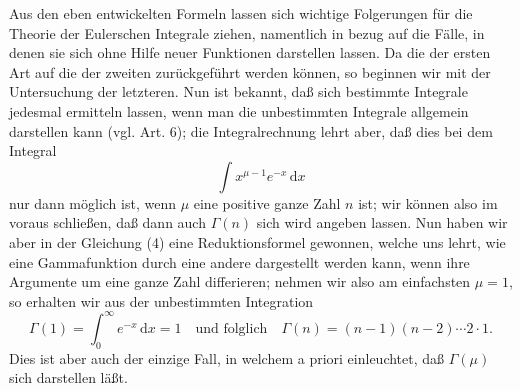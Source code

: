 \documentclass[11pt]{article}
\newcommand{\dd}{\,\mathrm d}
\begin{document}
Aus den eben entwickelten Formeln lassen sich wichtige Folgerungen für die Theorie der Eulerschen Integrale ziehen, namentlich in bezug auf die Fälle, in denen sie sich ohne Hilfe neuer Funktionen darstellen lassen. Da die der ersten Art auf die der zweiten zurückgeführt werden können, so beginnen wir mit der Untersuchung der letzteren. Nun ist bekannt, daß sich bestimmte Integrale jedesmal ermitteln lassen, wenn man die unbestimmten Integrale allgemein darstellen kann (vgl. Art. 6); die Integralrechnung lehrt aber, daß dies bei dem Integral
\[
\int x^{\mu-1}e^{-x}\dd x
\]
nur dann möglich ist, wenn $\mu$ eine positive ganze Zahl $n$ ist; wir können also im voraus schließen, daß dann auch $\Gamma(n)$ sich wird angeben lassen. Nun haben wir aber in der Gleichung (4) eine Reduktionsformel gewonnen, welche uns lehrt, wie eine Gammafunktion durch eine andere dargestellt werden kann, wenn ihre Argumente um eine ganze Zahl differieren; nehmen wir also am einfachsten $\mu=1$, so erhalten wir aus der unbestimmten Integration
\begin{equation}
\Gamma(1)=\int_0^\infty e^{-x}\dd x=1 \quad\text{und folglich}\quad
\Gamma(n)=(n-1)(n-2)\cdots2\cdot1.
\tag{5}
\end{equation}
Dies ist aber auch der einzige Fall, in welchem a priori einleuchtet, daß $\Gamma(\mu)$ sich darstellen läßt.
\end{document}
